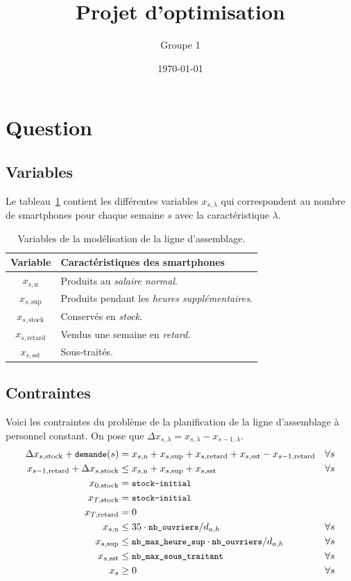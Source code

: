 \documentclass[12pt,oneside,a4paper]{article}
\title{Projet d'optimisation}
\author{Groupe 1}
\date{\today}
\newcommand{\question}
{
\addtocounter{section}{1}
\section*{Question \thesection}
}
\newcommand{\myX}[2]{x_{#1,\text{#2}}}
\newcommand{\xSemaine}[1]{\myX{s}{#1}}
\newcommand{\xn}{\xSemaine{n}}
\newcommand{\xsup}{\xSemaine{sup}}
\newcommand{\xstock}{\xSemaine{stock}}
\newcommand{\xretard}{\xSemaine{retard}}
\newcommand{\xsst}{\xSemaine{sst}}
\newcommand{\texttts}[1]{{\small\texttt{#1}}}
\begin{document}
\maketitle

\question %

\subsection*{Variables}
Le tableau~\ref{tab:variablesQuestion1} contient les différentes variables $x_{s,\lambda}$
qui correspondent au nombre de smartphones pour chaque semaine $s$
avec la caractéristique $\lambda$.

\begin{table}[h]
  \begin{center}
  \begin{tabular}{|c|l|}
    \hline
    Variable & Caractéristiques des smartphones \\
    \hline
    \hline
    $\xn$ & Produits au \emph{salaire normal}. \\
    \hline
    $\xsup$ & Produits pendant les \emph{heures supplémentaires}. \\
    \hline
    $\xstock$ & Conservés en \emph{stock}. \\
    \hline
    $\xretard$ & Vendus une semaine en \emph{retard}. \\
    \hline
    $\xsst$ & Sous-traités. \\
    \hline
  \end{tabular}
  \caption{Variables de la modélisation de la ligne d'assemblage.}
  \label{tab:variablesQuestion1}
  \end{center}
\end{table}

\subsection*{Contraintes}
Voici les contraintes du problème de la planification 
de la ligne d’assemblage à personnel constant.
On pose que $\Delta x_{s,\lambda} = x_{s,\lambda} - x_{s-1,\lambda}$.
\begin{align*}
  \Delta\xstock + \texttts{demande}(s) &= \xn + \xsup 
  + \xretard + \xsst - \myX{s-1}{retard} &\forall s \\
  \myX{s-1}{retard} + \Delta\xstock &\leq \xn + \xsup + \xsst &\forall s \\
  \myX{0}{stock} &= \texttts{stock-initial} \\
  \myX{T}{stock} &= \texttts{stock-initial} \\
  \myX{T}{retard}&= 0 \\
  \xn &\leq 35\cdot \texttts{nb\_ouvriers}/ d_{a,h}
  &\forall s \\
  \xsup &\leq \texttts{nb\_max\_heure\_sup}\cdot\texttts{nb\_ouvriers}/ d_{a,h}
  &\forall s \\
  \xsst &\leq \texttts{nb\_max\_sous\_traitant} &\forall s \\
  x_s &\geq 0 &\forall s
\end{align*}
\end{document}
